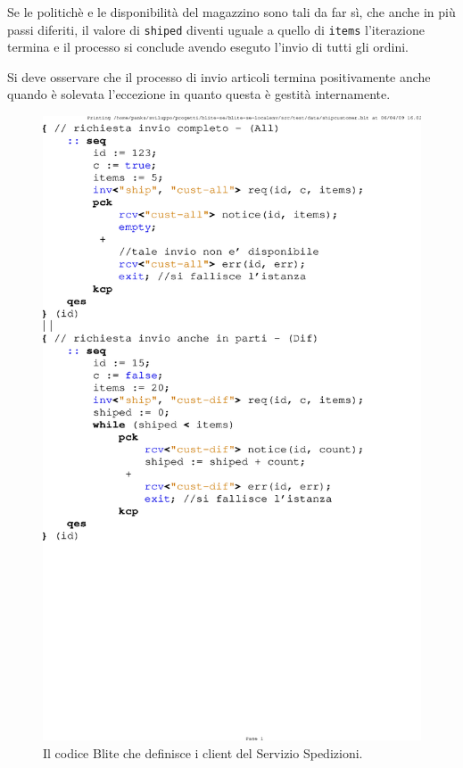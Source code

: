 Se le politichè e le disponibilità del magazzino sono tali da far sì, che anche
in più passi diferiti, il valore di \texttt{shiped} diventi uguale a quello di
\texttt{items} l'iterazione termina e il processo si conclude avendo eseguto
l'invio di tutti gli ordini.

Si deve osservare che il processo di invio articoli termina positivamente anche
quando è solevata l'eccezione in quanto questa è gestità internamente.
\\

\begin{figure}[t!]
\begin{center}
  \includegraphics[scale=0.80,clip]{blide/dia/clients}
   \caption[Codice Blite, Clienti del Servizio Spedizioni]{Il codice Blite che
   definisce i client del Servizio Spedizioni.}
  \label{fig:clients}
\end{center}
\end{figure}

